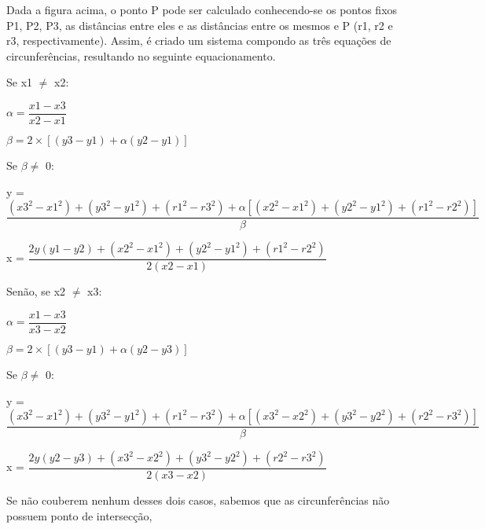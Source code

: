 Dada a figura acima, o ponto P pode ser calculado conhecendo-se os pontos fixos P1, P2, P3, as distâncias entre eles e as distâncias entre os mesmos e P (r1, r2 e r3, respectivamente). Assim, é criado um sistema compondo as três equações de circunferências, resultando no seguinte equacionamento.

Se x1 $\neq$ x2:

\quad $\alpha = \dfrac{x1 - x3}{x2 - x1}$

\quad $\beta = 2 \times [(y3 - y1) + \alpha(y2 - y1)]$

\quad Se $\beta \neq$ 0:

\quad \quad y = $\dfrac{(x3^2 - x1^2) + (y3^2 - y1^2) + (r1^2 - r3^2) + \alpha[(x2^2 - x1^2) + (y2^2 - y1^2) + (r1^2 - r2^2)]}{\beta}$

\quad \quad x = $\dfrac{2y(y1 - y2) + (x2^2 - x1^2) + (y2^2 - y1^2) + (r1^2 - r2^2)}{2(x2 - x1)}$

Senão, se x2 $\neq$ x3:

\quad $\alpha = \dfrac{x1 - x3}{x3 - x2}$

\quad $\beta = 2 \times [(y3 - y1) + \alpha(y2 - y3)]$

\quad Se $\beta \neq$ 0:

\quad \quad y = $\dfrac{(x3^2 - x1^2) + (y3^2 - y1^2) + (r1^2 - r3^2) + \alpha[(x3^2 - x2^2) + (y3^2 - y2^2) + (r2^2 - r3^2)]}{\beta}$

\quad \quad x = $\dfrac{2y(y2 - y3) + (x3^2 - x2^2) + (y3^2 - y2^2) + (r2^2 - r3^2)}{2(x3 - x2)}$

Se não couberem nenhum desses dois casos, sabemos que as circunferências não possuem ponto de intersecção,

